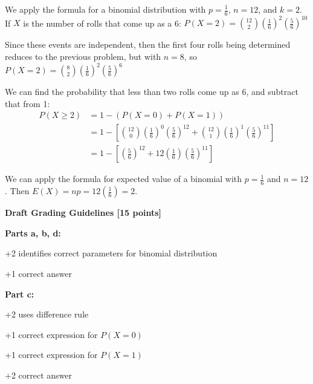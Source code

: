 \documentclass[12pt]{exam}
\begin{document}
\begin{solution}
\begin{qparts}
    \item We apply the formula for a binomial distribution with $p = \frac{1}{6}$, $n = 12$, and $k=2$. If $X$ is the number of rolls that come up as a 6: $P(X = 2) = \binom{12}{2}(\frac{1}{6})^2(\frac{5}{6})^{10}$
    
    \item Since these events are independent, then the first four rolls being determined reduces to the previous problem, but with $n=8$, so $P(X = 2) = \binom{8}{2}(\frac{1}{6})^2(\frac{5}{6})^6$
    
    \item We can find the probability that less than two rolls come up as 6, and subtract that from 1:
    \begin{align*}
        P(X \geq 2) &= 1 - (P(X = 0) + P(X = 1)) \\
        &= 1-\left[\binom{12}{0}\left(\frac{1}{6}\right)^0\left(\frac{5}{6}\right)^{12} + \binom{12}{1}\left(\frac{1}{6}\right)^1\left(\frac{5}{6}\right)^{11}\right] \\
        &= 1-\left[\left(\frac{5}{6}\right)^{12} + 12\left(\frac{1}{6}\right)\left(\frac{5}{6}\right)^{11}\right]
    \end{align*}

    \item We can apply the formula for expected value of a binomial with $p = \frac{1}{6}$ and $n = 12$. Then $E(X) = np = 12 (\frac{1}{6}) = 2$.
\end{qparts}

\textbf{Draft Grading Guidelines [15 points]}

\textbf{Parts a, b, d:}
\begin{guidelines}
    \item +2 identifies correct parameters for binomial distribution
    \item +1 correct answer
\end{guidelines}
\textbf{Part c:}
\begin{guidelines}
    \item +2 uses difference rule
    \item +1 correct expression for $P(X=0)$
    \item +1 correct expression for $P(X=1)$
    \item +2 correct answer
\end{guidelines}
\end{solution}
\end{document}
